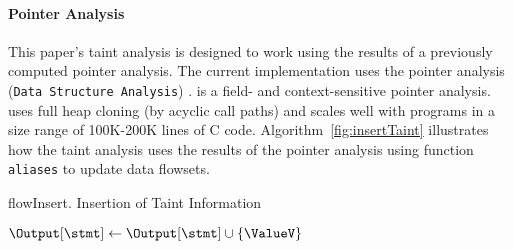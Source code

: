 \paragraph{Pointer Analysis}
This paper's taint analysis is designed to work using the results of
a previously computed pointer analysis.
The current implementation uses the pointer analysis \DSA (\texttt{Data Structure Analysis}) \cite{DSA:PLDI07}.
\DSA is a field- and context-sensitive pointer analysis.
\DSA uses full heap cloning (by acyclic call paths) and 
scales well with programs in a size range of 100K-200K lines of C code. 
Algorithm~\ref{fig:insertTaint} illustrates how the taint analysis uses
the results of the pointer analysis using function \texttt{aliases}
to update data flowsets.
\begin{algorithm}
\caption{flowInsert. Insertion of Taint Information}\label{fig:insertTaint}
\LinesNumbered
\DontPrintSemicolon
{}

\OutData{}
$\Output[\stmt] \leftarrow \Output[\stmt] \cup \{ \ValueV \}$\;
	\ForEach{$\ValueW \in \Aliases(\ValueV)$}{			
		$\Output[\stmt] \leftarrow \Output[\stmt] \cup \{ \ValueW \}$\;
	}
\end{algorithm}

